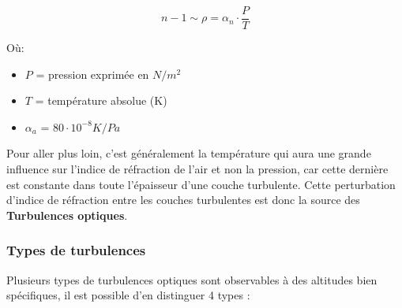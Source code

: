 \begin{equation}
  n-1 \sim \rho = \alpha_n \cdot \frac{P}{T}
\end{equation}

Où:
\begin{itemize}
  \item $P$ = pression exprimée en $N/m^2$
  \item $T$ = température absolue (K)
  \item $\alpha_a$ = $80\cdot10^{-8} K/Pa$
\end{itemize}

Pour aller plus loin, c'est généralement la température qui aura une grande influence sur l'indice de réfraction de l'air
et non la pression, car cette dernière est constante dans toute l'épaisseur d'une couche turbulente. Cette perturbation d'indice de
réfraction entre les couches turbulentes est donc la source des \textbf{Turbulences optiques}\cite{thèse_laurent_turbulence}.

\newpage
\subsubsection{Types de turbulences}
Plusieurs types de turbulences optiques sont observables à des altitudes bien spécifiques,
il est possible d'en distinguer 4 types :

